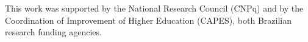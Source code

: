 %

\begin{acknowledgements}
This work was supported by the National Research Council (CNPq) and by the Coordination of Improvement of Higher Education (CAPES), both Brazilian research funding agencies.
\end{acknowledgements}


